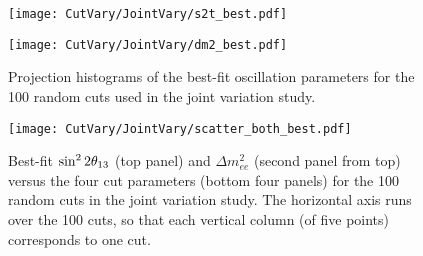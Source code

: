 \documentclass[../thesis.tex]{subfiles}
\begin{document}
\begin{figure}[ht]
  \begin{minipage}{0.5\linewidth}%
    \texttt{[image: CutVary/JointVary/s2t\_best.pdf]}%
  \end{minipage}%
  \begin{minipage}{0.5\linewidth}%
    \texttt{[image: CutVary/JointVary/dm2\_best.pdf]}%
  \end{minipage}%
  \caption{Projection histograms of the best-fit oscillation parameters for the 100 random cuts used in the joint variation study.}
  \label{fig:cutVaryJointVaryResults}
\end{figure}

\begin{figure}[h]
  \texttt{[image: CutVary/JointVary/scatter\_both\_best.pdf]}
  \caption{Best-fit $\sin^2 2\theta_{13}$ (top panel) and $\Delta m^2_{ee}$ (second panel from top) versus the four cut parameters (bottom four panels) for the 100 random cuts in the joint variation study. The horizontal axis runs over the 100 cuts, so that each vertical column (of five points) corresponds to one cut.}
  \label{fig:cutVaryJointVaryScatter}
\end{figure}

\end{document}
